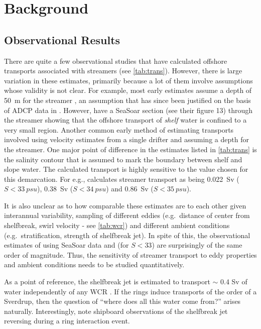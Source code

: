 \section{Background}

\subsection{Observational Results}

There are quite a few observational studies that have calculated offshore transports associated with streamers (see \cref{tab:trans}). However, there is large variation in these estimates, primarily because a lot of them involve assumptions whose validity is not clear. For example, most early estimates assume a depth of \SI{50}{\m} for the streamer  \citep[or \SI{100}{\m} in][]{Wei2008}, an assumption that has since been justified on the basis of ADCP data in \cite{Joyce1992}. However, \cite{Lee2010} have a SeaSoar section (see their figure 13) through the streamer showing that the offshore transport of \emph{shelf} water is confined to a very small region. Another common early method of estimating transports involved using velocity estimates from a single drifter and assuming a depth for the streamer. One major point of difference in the estimates listed in \cref{tab:trans} is the salinity contour that is assumed to mark the boundary between shelf and slope water. The calculated transport is highly sensitive to the value chosen for this demarcation. For e.g., \cite{Joyce1992} calculates streamer transport as being \SI{0.022}{Sv} ($S < \SI{33}{psu}$), \SI{0.38}{Sv} ($S < \SI{34}{psu}$) and \SI{0.86}{Sv} ($S< \SI{35}{psu}$). 

It is also unclear as to how comparable these estimates are to each other given interannual variability, sampling of different eddies (e.g.\ distance of center from shelfbreak, swirl velocity - see \cref{tab:wcr}) and different ambient conditions (e.g.\ stratification, strength of shelfbreak jet). In spite of this, the observational estimates of \cite{Lee2010} using SeaSoar data and \cite{Joyce1992} (for $S<33$) are surprisingly of the same order of magnitude. Thus, the sensitivity of streamer transport to eddy properties and ambient conditions needs to be studied quantitatively.

As a point of reference, the shelfbreak jet is estimated to transport $\sim$ 0.4 Sv of water independently of any WCR \citep{Fratantoni2001}. If the rings induce transports of the order of a Sverdrup, then the question of “where does all this water come from?” arises naturally. Interestingly, \cite{Cenedese2012} note shipboard observations of the shelfbreak jet reversing during a ring interaction event. 

